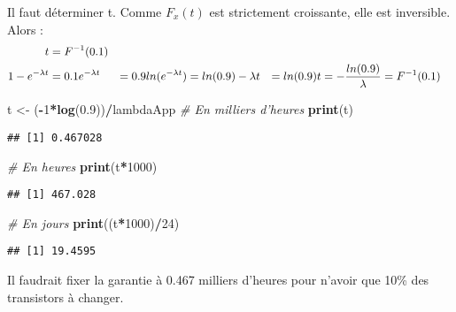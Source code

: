 \documentclass[]{article}
\newenvironment{Shaded}{\begin{snugshade}}{\end{snugshade}}
\newcommand{\KeywordTok}[1]{\textcolor[rgb]{0.13,0.29,0.53}{\textbf{#1}}}
\newcommand{\DecValTok}[1]{\textcolor[rgb]{0.00,0.00,0.81}{#1}}
\newcommand{\FloatTok}[1]{\textcolor[rgb]{0.00,0.00,0.81}{#1}}
\newcommand{\StringTok}[1]{\textcolor[rgb]{0.31,0.60,0.02}{#1}}
\newcommand{\CommentTok}[1]{\textcolor[rgb]{0.56,0.35,0.01}{\textit{#1}}}
\newcommand{\OperatorTok}[1]{\textcolor[rgb]{0.81,0.36,0.00}{\textbf{#1}}}
\newcommand{\NormalTok}[1]{#1}
\begin{document}
Il faut déterminer t. Comme \(F_x(t)\) est strictement croissante, elle
est inversible. Alors : \[
\begin{align}
t &= F^{-1}(0.1) \\
1 - e^{-\lambda t} &= 0.1 \newline
e^{-\lambda t} &= 0.9 \newline
ln(e^{-\lambda t }) &= ln(0.9) \newline 
-\lambda t &= ln(0.9) \newline
t &= -\frac{ln(0.9)}{\lambda} = F^{-1}(0.1)
\end{align}
\]

\begin{Shaded}
\begin{Highlighting}[]
\NormalTok{t <-}\StringTok{ }\NormalTok{(}\OperatorTok{-}\DecValTok{1}\OperatorTok{*}\KeywordTok{log}\NormalTok{(}\FloatTok{0.9}\NormalTok{))}\OperatorTok{/}\NormalTok{lambdaApp}
\CommentTok{# En milliers d'heures}
\KeywordTok{print}\NormalTok{(t)}
\end{Highlighting}
\end{Shaded}

\begin{verbatim}
## [1] 0.467028
\end{verbatim}

\begin{Shaded}
\begin{Highlighting}[]
\CommentTok{# En heures}
\KeywordTok{print}\NormalTok{(t}\OperatorTok{*}\DecValTok{1000}\NormalTok{)}
\end{Highlighting}
\end{Shaded}

\begin{verbatim}
## [1] 467.028
\end{verbatim}

\begin{Shaded}
\begin{Highlighting}[]
\CommentTok{# En jours}
\KeywordTok{print}\NormalTok{((t}\OperatorTok{*}\DecValTok{1000}\NormalTok{)}\OperatorTok{/}\DecValTok{24}\NormalTok{)}
\end{Highlighting}
\end{Shaded}

\begin{verbatim}
## [1] 19.4595
\end{verbatim}

Il faudrait fixer la garantie à 0.467 milliers d'heures pour n'avoir que
10\% des transistors à changer.
\end{document}
